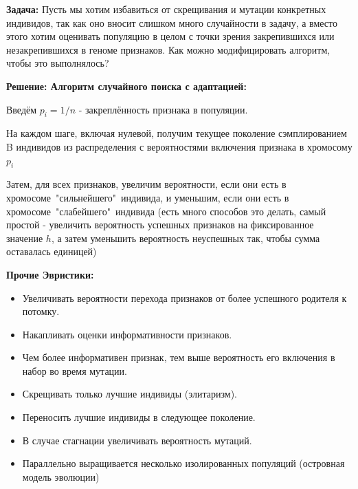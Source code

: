 \textbf{Задача:} Пусть мы хотим избавиться от скрещивания и мутации конкретных индивидов, так как оно вносит слишком много случайности в задачу, а вместо этого хотим оценивать популяцию в целом с точки зрения закрепившихся или незакрепившихся в геноме признаков. 
Как можно модифицировать алгоритм, чтобы это выполнялось?

\textbf{Решение: Алгоритм случайного поиска с адаптацией:}

Введём $p_i = 1/n$ - закреплённость признака в популяции.

На каждом шаге, включая нулевой, получим текущее поколение сэмплированием B индивидов из распределения с вероятностями включения признака в хромосому $p_i$

Затем, для всех признаков, увеличим вероятности, если они есть в хромосоме\ "сильнейшего"\ индивида, и уменьшим, если они есть в хромосоме\ "слабейшего"\ индивида 
(есть много способов это делать, самый простой - увеличить вероятность успешных признаков на фиксированное значение $h$, а затем уменьшить вероятность неуспешных так, чтобы сумма оставалась единицей)

\textbf{Прочие Эвристики:}\begin{itemize}
\item Увеличивать вероятности перехода признаков от более успешного родителя к потомку.
\item Накапливать оценки информативности признаков.
\item Чем более информативен признак, тем выше вероятность его включения в набор во время мутации.
\item Скрещивать только лучшие индивиды (элитаризм).
\item Переносить лучшие индивиды в следующее поколение.
\item В случае стагнации увеличивать вероятность мутаций.
\item Параллельно выращивается несколько изолированных популяций (островная модель эволюции)
\end{itemize}
